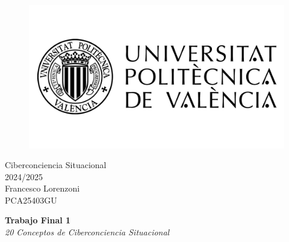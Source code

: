 \begin{titlepage}
   \begin{figure}
      \vspace{50mm}
       \centering
       \includegraphics[keepaspectratio=true,width=0.40\columnwidth]{images/upvLogo.png}
   \end{figure}
   
   \vspace{40mm}
   \begin{center}
       \LARGE{Ciberconciencia Situacional}
       \vspace{2.5mm}
       \\ \large{2024/2025}
       \vspace{5mm}
       \\ \large{Francesco Lorenzoni\\\textsc{PCA25403GU}}
   \end{center}
   
   \begin{center}
      \vspace{10mm}
       {\LARGE{\textbf{Trabajo Final 1}\\ \vspace{5mm}
       \textit{20 Conceptos de Ciberconciencia Situacional}}}
       
   \end{center}
\end{titlepage}